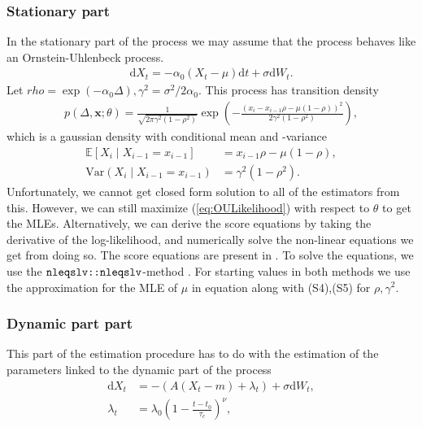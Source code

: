 \subsubsection{Stationary part}\label{subsubsec:OUprocessStationary}
In the stationary part of the process we may assume that the process behaves like an Ornstein-Uhlenbeck process. 
\begin{align}
    \mathrm{d}X_t = -\alpha_0\left(X_t-\mu\right) \mathrm{d}t + \sigma \mathrm{d}W_t.
\end{align}
Let $rho = \exp\left(-\alpha_0\Delta\right), \gamma^2 = \sigma^2/2\alpha_0$. This process has transition density 
\begin{align}
    p\left(\Delta, \mathbf{x};\theta\right) = \frac{1}{\sqrt{2\pi\gamma^2\left(1-\rho^2\right)}}\exp\left(-\frac{\left(x_i-x_{i-1}\rho - \mu\left(1-\rho\right)\right)^2}{2\gamma^2\left(1-\rho^2\right)}\right), \label{eq:OULikelihood}
\end{align}
which is a gaussian density with conditional mean and -variance
\begin{align}
    \mathbb{E}\left[X_i\middle|X_{i-1} = x_{i-1}\right] &= x_{i - 1}\rho - \mu\left(1-\rho\right),\\
    \mathrm{Var}\left(X_i\middle|X_{i-1} = x_{i-1}\right) &= \gamma^2\left(1-\rho^2\right).
\end{align}
Unfortunately, we cannot get closed form solution to all of the estimators from this. However, we can still maximize (\ref{eq:OULikelihood}) with respect to $\theta$ to get the MLEs. Alternatively, we can derive the score equations by taking the derivative of the log-likelihood, and numerically solve the non-linear equations we get from doing so. The score equations are present in \cite{DitlevsenSupplementary}. To solve the equations, we use the $\texttt{nleqslv::nleqslv}$-method \cite{nleqslv}. For starting values in both methods we use the approximation for the MLE of $\mu$ in equation \cite[(S4)]{DitlevsenSupplementary} along with (S4),(S5) for $\rho, \gamma^2$. 
\subsubsection{Dynamic part part}\label{subsubsec:OUprocessDynamic}
This part of the estimation procedure has to do with the estimation of the parameters linked to the dynamic part of the process
\begin{align}
    \mathrm{d}X_t &= -\left(A\left(X_t - m\right) + \lambda_t\right) + \sigma \mathrm{d}W_t,\\
    \lambda_t &= \lambda_0\left(1 - \frac{t - t_0}{\tau_c}\right)^\nu,
\end{align}
